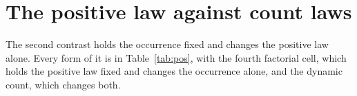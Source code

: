 \providecommand{\lm}{\texttt{local\_mean\_28}}
\providecommand{\qs}{QScore9}
\providecommand{\hc}{\texttt{hurdle\_count\_28}}

\section{The positive law against count laws}
\label{sec:positive}

The second contrast holds the occurrence fixed and changes the positive law alone. Every form of it is in
Table~\ref{tab:pos}, with the fourth factorial cell, which holds the positive law fixed and changes the
occurrence alone, and the dynamic count, which changes both.

